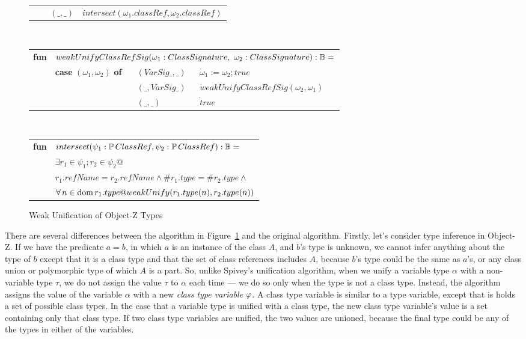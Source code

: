 \begin{figure}[!t]
\begin{tabular}{llll}
      & & $(\_,\_)$ & $\dot intersect(\omega_1.classRef, \omega_2.classRef)$
\end{tabular}
\vspace{2mm}\\
\begin{tabular}{llll}
  {\bf fun} &
  \multicolumn{3}{l}{$weakUnifyClassRefSig(\omega_1:ClassSignature,~\omega_2:ClassSignature) : {\mathbb B} =$}\\
  & {\bf case} $(\omega_1,\omega_2)$ {\bf of} & $(VarSig \_, \_ )$
  & $\dot \omega_1 := \omega_2; true$\\
      & & $(\_, VarSig \_)$ & $\dot weakUnifyClassRefSig(\omega_2,\omega_1)$\\
      & & $(\_, \_)$ & $\dot true$\\
\end{tabular}
\vspace{2mm}\\
\begin{tabular}{ll}
  {\bf fun} & $intersect(\psi_1:\power ClassRef, \psi_2:\power ClassRef) : \bool =$\\
   & \quad\quad$\exists r_1 \in \psi_1; r_2 \in \psi_2 @$\\
   & \quad\quad\quad\quad $r_1.refName = r_2.refName \land \#r_1.type = \#r_2.type \land$\\
   & \quad\quad\quad\quad $\forall n \in \dom r_1.type @
       weakUnify(r_1.type(n), r_2.type(n))$
\end{tabular}
\caption{Weak Unification of Object-Z Types}
\label{weakUnify}
\end{figure}

There are several differences between the algorithm in
Figure~\ref{weakUnify} and the original algorithm. Firstly, let's
consider type inference in Object-Z. If we have the predicate $a = b$,
in which $a$ is an instance of the class $A$, and $b$'s type is
unknown, we cannot infer anything about the type of $b$ except that it
is a class type and that the set of class references includes $A$,
because $b$'s type could be the same as $a$'s, or any class union or
polymorphic type of which $A$ is a part. So, unlike Spivey's
unification algorithm, when we unify a variable type $\alpha$ with a
non-variable type $\tau$, we do not assign the value $\tau$ to
$\alpha$ each time --- we do so only when the type is not a class
type. Instead, the algorithm assigns the value of the variable
$\alpha$ with a new {\em class type variable} $\varphi$. A class
type variable is similar to a type variable, except that is holds a
set of possible class types. In the case that a variable type is
unified with a class type, the new class type variable's value is a
set containing only that class type. If two class type
variables are unified, the two values are unioned, because the final
type could be any of the types in either of the variables.
  
